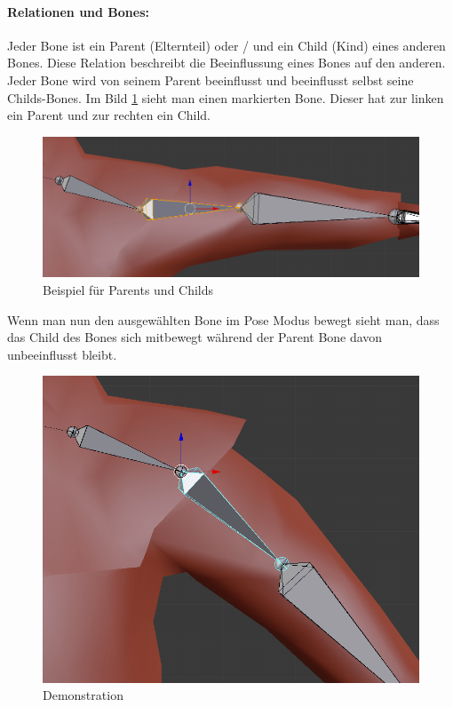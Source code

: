 \paragraph{Relationen und Bones:}
Jeder Bone ist ein Parent (Elternteil) oder / und ein Child (Kind) eines anderen Bones.
Diese Relation beschreibt die Beeinflussung eines Bones auf den anderen. Jeder Bone wird von seinem Parent beeinflusst und beeinflusst selbst seine Childs-Bones.
Im Bild \ref{Rigging:ParentChild} sieht man einen markierten Bone. Dieser hat zur linken ein Parent und zur rechten ein Child.

\begin{figure}[H]
    \centering

    \includegraphics[width=.8\textwidth]{images/bone_parent_child.png}
    \caption{Beispiel für Parents und Childs}
    \label{Rigging:ParentChild}
\end{figure}

Wenn man nun den ausgewählten Bone im Pose Modus bewegt sieht man, dass das Child des Bones sich mitbewegt während der Parent Bone davon unbeeinflusst bleibt.

\begin{figure}[H]
    \centering

    \includegraphics[width=.8\textwidth]{images/bone_parent_child_demonstration.png}
    \caption{Demonstration}
\end{figure}

